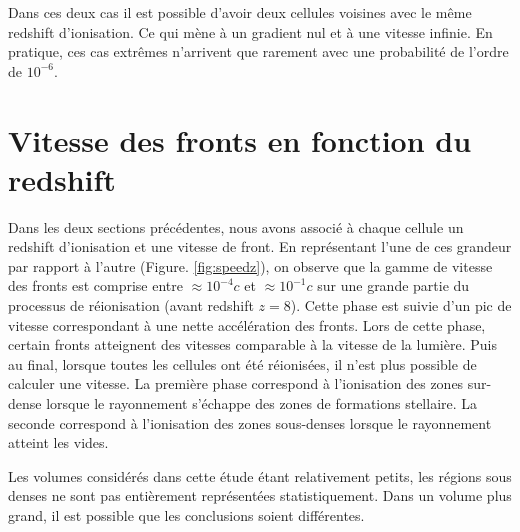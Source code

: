 Dans ces deux cas il est possible d'avoir deux cellules voisines avec le même redshift d'ionisation.
Ce qui mène à un gradient nul et à une vitesse infinie.
En pratique, ces cas extrêmes n'arrivent que rarement avec une probabilité de l'ordre de $10^{-6}$.

\section{Vitesse des fronts en fonction du redshift}

Dans les deux sections précédentes, nous avons associé à chaque cellule un redshift d'ionisation et une vitesse de front.
En représentant l'une de ces grandeur par rapport à l'autre (Figure. \ref{fig:speedz}), on observe que la gamme de vitesse des fronts est comprise entre $\approx 10^{-4}c$ et $\approx 10^{-1}c$ sur une grande partie du processus de réionisation (avant redshift $z=8$).
Cette phase est suivie d'un pic de vitesse correspondant à une nette accélération des fronts.
Lors de cette phase, certain fronts atteignent des vitesses comparable à la vitesse de la lumière.
Puis au final, lorsque toutes les cellules ont été réionisées, il n'est plus possible de calculer une vitesse.
La première phase correspond à l'ionisation des zones sur-dense lorsque le rayonnement s'échappe des zones de formations stellaire.
La seconde correspond à l'ionisation des zones sous-denses lorsque le rayonnement atteint les vides.



Les volumes considérés dans cette étude étant relativement petits, les régions sous denses ne sont pas entièrement représentées statistiquement.
Dans un volume plus grand, il est possible que les conclusions soient différentes.



